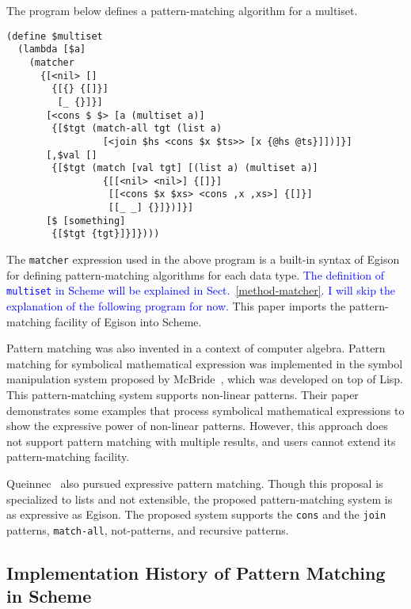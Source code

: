 \documentclass[acmlarge]{acmart}
\newcommand{\todo}[1]{\textcolor{red}{(TODO: #1)}}
\newcommand{\new}[1]{\textcolor{blue}{#1}}
\begin{document}
The program below defines a pattern-matching algorithm for a multiset.

\begin{lstlisting}[language=egison]
(define $multiset
  (lambda [$a]
    (matcher
      {[<nil> []
        {[{} {[]}]
         [_ {}]}]
       [<cons $ $> [a (multiset a)]
        {[$tgt (match-all tgt (list a)
                 [<join $hs <cons $x $ts>> [x {@hs @ts}]])]}]
       [,$val []
        {[$tgt (match [val tgt] [(list a) (multiset a)]
                 {[[<nil> <nil>] {[]}]
                  [[<cons $x $xs> <cons ,x ,xs>] {[]}]
                  [[_ _] {}]})]}]
       [$ [something]
        {[$tgt {tgt}]}]})))
\end{lstlisting}

\noindent
The \lstinline{matcher} expression used in the above program is a built-in syntax of Egison for defining pattern-matching algorithms for each data type.
\new{
The definition of \lstinline{multiset} in Scheme will be explained in Sect.~\ref{method-matcher}.
I will skip the explanation of the following program for now.
}%
This paper imports the pattern-matching facility of Egison into Scheme.

\medskip

Pattern matching was also invented in a context of computer algebra.
Pattern matching for symbolical mathematical expression was implemented in the symbol manipulation system proposed by McBride~\cite{mcbride1969symbol}, which was developed on top of Lisp.
This pattern-matching system supports non-linear patterns.
Their paper demonstrates some examples that process symbolical mathematical expressions to show the expressive power of non-linear patterns.
However, this approach does not support pattern matching with multiple results, and users cannot extend its pattern-matching facility.

Queinnec~\cite{queinnec1990compilation} also pursued expressive pattern matching.
Though this proposal is specialized to lists and not extensible, the proposed pattern-matching system is as expressive as Egison.
The proposed system supports the \lstinline{cons} and the \lstinline{join} patterns, \lstinline{match-all}, not-patterns, and recursive patterns.


\subsection{Implementation History of Pattern Matching in Scheme}\label{history2}
\end{document}
